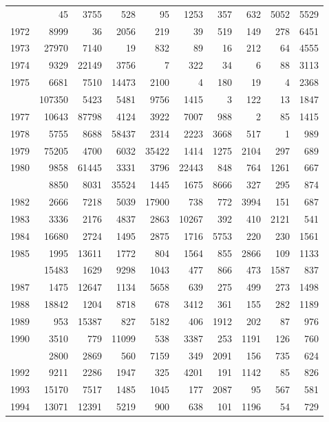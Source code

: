 \documentclass[
]{article}
\begin{document}
\begin{longtable}[t]{lrrrrrrrrr}
\addlinespace
1971 & 45 & 3755 & 528 & 95 & 1253 & 357 & 632 & 5052 & 5529\\
1972 & 8999 & 36 & 2056 & 219 & 39 & 519 & 149 & 278 & 6451\\
1973 & 27970 & 7140 & 19 & 832 & 89 & 16 & 212 & 64 & 4555\\
1974 & 9329 & 22149 & 3756 & 7 & 322 & 34 & 6 & 88 & 3113\\
1975 & 6681 & 7510 & 14473 & 2100 & 4 & 180 & 19 & 4 & 2368\\
\addlinespace
1976 & 107350 & 5423 & 5481 & 9756 & 1415 & 3 & 122 & 13 & 1847\\
1977 & 10643 & 87798 & 4124 & 3922 & 7007 & 988 & 2 & 85 & 1415\\
1978 & 5755 & 8688 & 58437 & 2314 & 2223 & 3668 & 517 & 1 & 989\\
1979 & 75205 & 4700 & 6032 & 35422 & 1414 & 1275 & 2104 & 297 & 689\\
1980 & 9858 & 61445 & 3331 & 3796 & 22443 & 848 & 764 & 1261 & 667\\
\addlinespace
1981 & 8850 & 8031 & 35524 & 1445 & 1675 & 8666 & 327 & 295 & 874\\
1982 & 2666 & 7218 & 5039 & 17900 & 738 & 772 & 3994 & 151 & 687\\
1983 & 3336 & 2176 & 4837 & 2863 & 10267 & 392 & 410 & 2121 & 541\\
1984 & 16680 & 2724 & 1495 & 2875 & 1716 & 5753 & 220 & 230 & 1561\\
1985 & 1995 & 13611 & 1772 & 804 & 1564 & 855 & 2866 & 109 & 1133\\
\addlinespace
1986 & 15483 & 1629 & 9298 & 1043 & 477 & 866 & 473 & 1587 & 837\\
1987 & 1475 & 12647 & 1134 & 5658 & 639 & 275 & 499 & 273 & 1498\\
1988 & 18842 & 1204 & 8718 & 678 & 3412 & 361 & 155 & 282 & 1189\\
1989 & 953 & 15387 & 827 & 5182 & 406 & 1912 & 202 & 87 & 976\\
1990 & 3510 & 779 & 11099 & 538 & 3387 & 253 & 1191 & 126 & 760\\
\addlinespace
1991 & 2800 & 2869 & 560 & 7159 & 349 & 2091 & 156 & 735 & 624\\
1992 & 9211 & 2286 & 1947 & 325 & 4201 & 191 & 1142 & 85 & 826\\
1993 & 15170 & 7517 & 1485 & 1045 & 177 & 2087 & 95 & 567 & 581\\
1994 & 13071 & 12391 & 5219 & 900 & 638 & 101 & 1196 & 54 & 729\\

\end{longtable}
\end{document}

